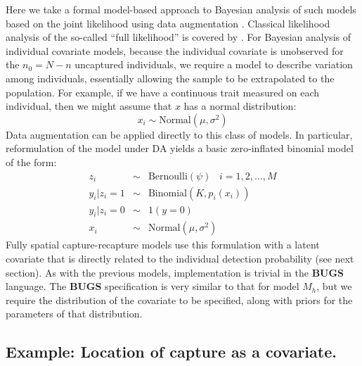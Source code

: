 Here we take a formal model-based approach to Bayesian analysis of
such models based on the joint likelihood using data augmentation
\citep{royle:2009}. Classical likelihood analysis of the so-called
``full likelihood'' is covered by \citet{borchers_etal:2002}.  For
Bayesian analysis of individual covariate models, because the
individual covariate is unobserved for the $n_{0} = N-n$ uncaptured
individuals, we require a model to describe variation among
individuals, essentially allowing the sample to be extrapolated to the
population.  For example, if we have a continuous trait measured on
each individual, then we might assume that $x$ has a normal distribution:
\[
x_{i} \sim \mbox{Normal}(\mu,\sigma^{2})
\]
Data augmentation can be applied directly to this class of models. In
particular, reformulation of the model under DA yields a basic
zero-inflated binomial model of the form:
\begin{eqnarray*}
z_{i} &\sim& \mbox{Bernoulli}(\psi) \; \; \; i=1,2,\ldots,M\\
y_{i}|{z_{i}\! =\! 1} &\sim& \mbox{Binomial}(K,p_{i}(x_{i})) \\
y_{i} |{ z_{i}\! =\! 0} &\sim& 1(y=0)  \\
x_{i} & \sim & \mbox{Normal}(\mu,\sigma^{2})
\end{eqnarray*}
Fully spatial capture-recapture models use this formulation with a
latent covariate that is directly related to the individual detection
probability (see next section). As with the previous models,
implementation is trivial in the {\bf BUGS} language. The {\bf BUGS}
specification is very similar to that for model $M_h$, but we require
the distribution of the covariate to be specified, along with priors
for the parameters of that distribution.


\subsection{Example: Location of capture as a covariate.}

